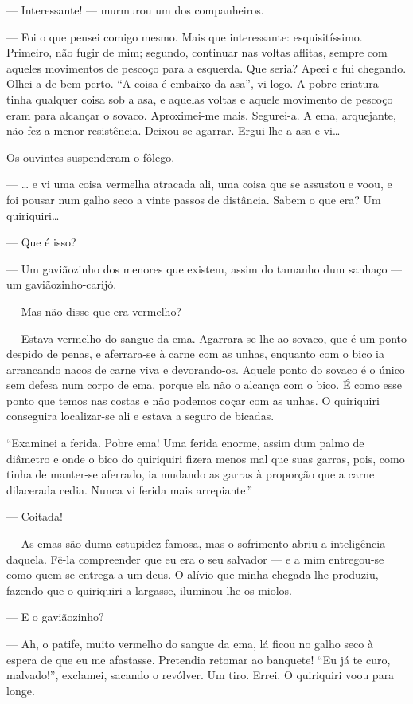 --- Interessante! --- murmurou um dos companheiros.

--- Foi o que pensei comigo mesmo. Mais que interessante:
esquisitíssimo. Primeiro, não fugir de mim; segundo, continuar nas
voltas aflitas, sempre com aqueles movimentos de pescoço para a
esquerda. Que seria? Apeei e fui chegando. Olhei-a de bem perto. ``A
coisa é embaixo da asa'', vi logo. A pobre criatura tinha qualquer coisa
sob a asa, e aquelas voltas e aquele movimento de pescoço eram para
alcançar o sovaco. Aproximei-me mais. Segurei-a. A ema, arquejante, não
fez a menor resistência. Deixou-se agarrar. Ergui-lhe a asa e vi\ldots{}

Os ouvintes suspenderam o fôlego.

--- \ldots{} e vi uma coisa vermelha atracada ali, uma coisa que se assustou
e voou, e foi pousar num galho seco a vinte passos de distância. Sabem o
que era? Um quiriquiri\ldots{}

--- Que é isso?

--- Um gaviãozinho dos menores que existem, assim do tamanho dum sanhaço
--- um gaviãozinho-carijó.

--- Mas não disse que era vermelho?

--- Estava vermelho do sangue da ema. Agarrara-se-lhe ao sovaco, que é
um ponto despido de penas, e aferrara-se à carne com as unhas, enquanto
com o bico ia arrancando nacos de carne viva e devorando-os. Aquele
ponto do sovaco é o único sem defesa num corpo de ema, porque ela não o
alcança com o bico. É como esse ponto que temos nas costas e não podemos
coçar com as unhas. O quiriquiri conseguira localizar-se ali e estava a
seguro de bicadas.

``Examinei a ferida. Pobre ema! Uma ferida enorme, assim dum palmo de
diâmetro e onde o bico do quiriquiri fizera menos mal que suas garras,
pois, como tinha de manter-se aferrado, ia mudando as garras à proporção
que a carne dilacerada cedia. Nunca vi ferida mais arrepiante.''

--- Coitada!

--- As emas são duma estupidez famosa, mas o sofrimento abriu a
inteligência daquela. Fê-la compreender que eu era o seu salvador --- e
a mim entregou-se como quem se entrega a um deus. O alívio que minha
chegada lhe produziu, fazendo que o quiriquiri a largasse, iluminou-lhe
os miolos.

--- E o gaviãozinho?

--- Ah, o patife, muito vermelho do sangue da ema, lá ficou no galho
seco à espera de que eu me afastasse. Pretendia retomar ao banquete!
``Eu já te curo, malvado!'', exclamei, sacando o revólver. Um tiro.
Errei. O quiriquiri voou para longe.

